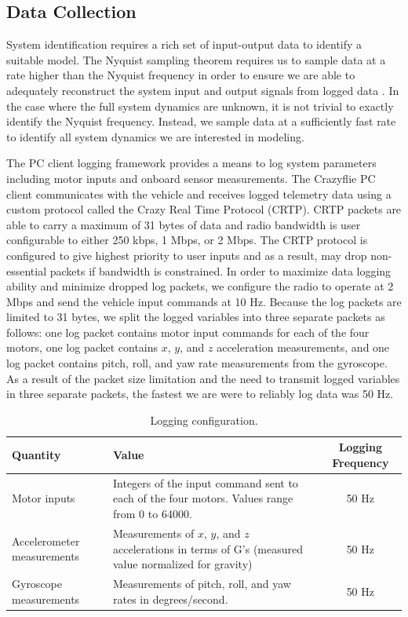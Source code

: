 \subsection{Data Collection}
System identification requires a rich set of input-output data to identify a suitable model. The Nyquist sampling theorem requires us to sample data at a rate higher than the Nyquist frequency in order to ensure we are able to adequately reconstruct the system input and output signals from logged data \cite{franklin1998digital}. In the case where the full system dynamics are unknown, it is not trivial to exactly identify the Nyquist frequency. Instead, we sample data at a sufficiently fast rate to identify all system dynamics we are interested in modeling. 

The PC client logging framework provides a means to log system parameters including motor inputs and onboard sensor measurements. The Crazyflie PC client communicates with the vehicle and receives logged telemetry data using a custom protocol called the Crazy Real Time Protocol (CRTP). CRTP packets are able to carry a maximum of 31 bytes of data and radio bandwidth is user configurable to either 250 kbps, 1 Mbps, or 2 Mbps. The CRTP protocol is configured to give highest priority to user inputs and as a result, may drop non-essential packets if bandwidth is constrained. In order to maximize data logging ability and minimize dropped log packets, we configure the radio to operate at 2 Mbps and send the vehicle input commands at 10 Hz. Because the log packets are limited to 31 bytes, we split the logged variables into three separate packets as follows: one log packet contains motor input commands for each of the four motors, one log packet contains $x$, $y$, and $z$ acceleration measurements, and one log packet contains pitch, roll, and yaw rate measurements from the gyroscope. As a result of the packet size limitation and the need to transmit logged variables in three separate packets, the fastest we are were to reliably log data was 50 Hz.
\begin{table}[!htb]
\centering
\caption{Logging configuration.}
\begin{tabular}{p{7em}p{17em}c}
\toprule
Quantity & Value & Logging Frequency\\
\midrule
Motor inputs & Integers of the input command sent to each of the four motors. Values range from 0 to 64000. & 50 Hz \\[5em]
Accelerometer measurements & Measurements of $x$, $y$, and $z$ accelerations in terms of G's (measured value normalized for gravity) & 50 Hz\\[3em]
Gyroscope \hspace{2em}measurements & Measurements of pitch, roll, and yaw rates in degrees/second. & 50 Hz\\
\bottomrule
\end{tabular}
\end{table}

